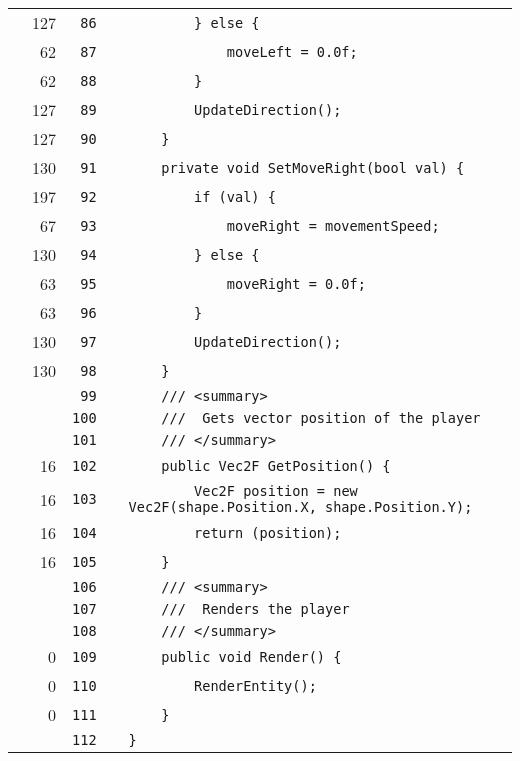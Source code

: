 \documentclass[a4paper,landscape,10pt]{article}
\begin{document}
\begin{longtable}[l]{lrrll}
\cellcolor{green} & 127 & \verb~86~ & & \verb~        } else {~\\
\cellcolor{green} & 62 & \verb~87~ & & \verb~            moveLeft = 0.0f;~\\
\cellcolor{green} & 62 & \verb~88~ & & \verb~        }~\\
\cellcolor{green} & 127 & \verb~89~ & & \verb~        UpdateDirection();~\\
\cellcolor{green} & 127 & \verb~90~ & & \verb~    }~\\
\cellcolor{green} & 130 & \verb~91~ & & \verb~    private void SetMoveRight(bool val) {~\\
\cellcolor{green} & 197 & \verb~92~ & & \verb~        if (val) {~\\
\cellcolor{green} & 67 & \verb~93~ & & \verb~            moveRight = movementSpeed;~\\
\cellcolor{green} & 130 & \verb~94~ & & \verb~        } else {~\\
\cellcolor{green} & 63 & \verb~95~ & & \verb~            moveRight = 0.0f;~\\
\cellcolor{green} & 63 & \verb~96~ & & \verb~        }~\\
\cellcolor{green} & 130 & \verb~97~ & & \verb~        UpdateDirection();~\\
\cellcolor{green} & 130 & \verb~98~ & & \verb~    }~\\
\cellcolor{gray} &  & \verb~99~ & & \verb~    /// <summary>~\\
\cellcolor{gray} &  & \verb~100~ & & \verb~    ///  Gets vector position of the player~\\
\cellcolor{gray} &  & \verb~101~ & & \verb~    /// </summary>~\\
\cellcolor{green} & 16 & \verb~102~ & & \verb~    public Vec2F GetPosition() {~\\
\cellcolor{green} & 16 & \verb~103~ & & \verb~        Vec2F position = new Vec2F(shape.Position.X, shape.Position.Y);~\\
\cellcolor{green} & 16 & \verb~104~ & & \verb~        return (position);~\\
\cellcolor{green} & 16 & \verb~105~ & & \verb~    }~\\
\cellcolor{gray} &  & \verb~106~ & & \verb~    /// <summary>~\\
\cellcolor{gray} &  & \verb~107~ & & \verb~    ///  Renders the player~\\
\cellcolor{gray} &  & \verb~108~ & & \verb~    /// </summary>~\\
\cellcolor{red} & 0 & \verb~109~ & & \verb~    public void Render() {~\\
\cellcolor{red} & 0 & \verb~110~ & & \verb~        RenderEntity();~\\
\cellcolor{red} & 0 & \verb~111~ & & \verb~    }~\\
\cellcolor{gray} &  & \verb~112~ & & \verb~}~\\
\end{longtable}
\newpage
\end{document}
